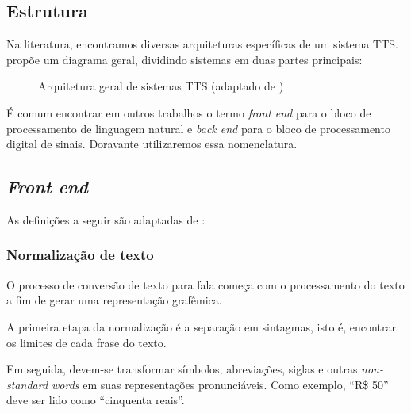 \subsection{Estrutura}
Na literatura, encontramos diversas arquiteturas específicas de um sistema TTS.
 propõe um diagrama geral, dividindo sistemas em duas partes principais:

\begin{figure}[!htbp]
\centering
{}
\caption{Arquitetura geral de sistemas TTS (adaptado de )}
\label{fig:tts-arch}
\end{figure}
É comum encontrar em outros trabalhos o termo \emph{front end} para o
bloco de processamento de linguagem natural e \emph{back end} para o bloco de
processamento digital de sinais. Doravante utilizaremos essa nomenclatura.

\subsection{\emph{Front end}}
As definições a seguir são adaptadas de \cite{martinjurafsky}:

\subsubsection{Normalização de texto}
O processo de conversão de texto para fala começa com o processamento do texto a
fim de gerar uma representação grafêmica.

A primeira etapa da normalização é a separação em sintagmas, isto é, encontrar os
limites de cada frase do texto. 

Em seguida, devem-se transformar símbolos, abreviações, siglas e outras
\emph{non-standard words} em suas representações pronunciáveis. Como exemplo, ``R\$
50'' deve ser lido como ``cinquenta reais''.

